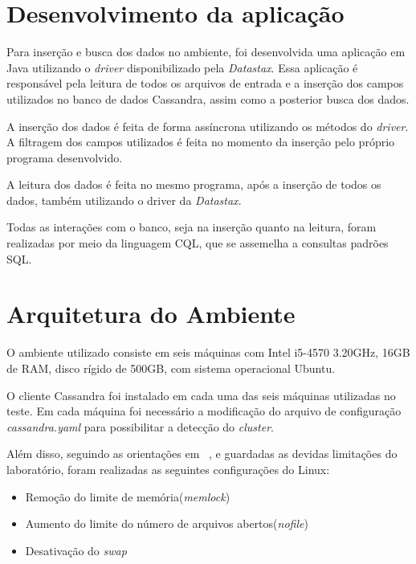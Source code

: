 \section{Desenvolvimento da aplicação}
Para inserção e busca dos dados no ambiente, foi desenvolvida uma aplicação em Java utilizando o \emph{driver} disponibilizado pela \emph{Datastax}. Essa aplicação é responsável pela leitura de todos os arquivos de entrada e a inserção dos campos utilizados no banco de dados Cassandra, assim como a posterior busca dos dados.

A inserção dos dados é feita de forma assíncrona utilizando os métodos do \emph{driver}. A filtragem dos campos utilizados é feita no momento da inserção pelo próprio programa desenvolvido.

A leitura dos dados é feita no mesmo programa, após a inserção de todos os dados, também utilizando o driver da \emph{Datastax}.

Todas as interações com o banco, seja na inserção quanto na leitura, foram realizadas por meio da linguagem CQL, que se assemelha a consultas padrões SQL.

\section{Arquitetura do Ambiente}
O ambiente utilizado consiste em seis máquinas com Intel i5-4570 3.20GHz, 16GB de RAM, disco rígido de 500GB, com sistema operacional Ubuntu.

O cliente Cassandra foi instalado em cada uma das seis máquinas utilizadas no teste. Em cada máquina foi necessário a modificação do arquivo de configuração \emph{cassandra.yaml} para possibilitar a detecção do \emph{cluster}.

Além disso, seguindo as orientações em ~\cite{cassandrasettings}, e guardadas as devidas limitações do laboratório, foram realizadas as seguintes configurações do Linux:
\begin{itemize}
	\item Remoção do limite de memória(\emph{memlock})
	\item Aumento do limite do número de arquivos abertos(\emph{nofile})
	\item Desativação do \emph{swap}
\end{itemize}




